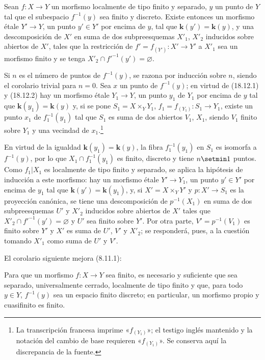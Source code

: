 \begin{corollary}[18.12.3]
\label{IV.18.12.3}
Sean $f:X\to Y$ un morfismo localmente de tipo finito y separado, $y$ un punto de $Y$ tal que el subespacio $f^{-1}(y)$ sea finito y discreto. Existe entonces un morfismo étale $Y'\to Y$, un punto $y'\in Y'$ por encima de $y$, tal que $\boldsymbol{k}(y')=\boldsymbol{k}(y)$, y una descomposición de $X'$ en suma de dos subpreesquemas $X'_1$, $X'_2$ inducidos sobre abiertos de $X'$, tales que la restricción de $f'=f_{(Y')}:X'\to Y'$ a $X'_1$ sea un morfismo finito y se tenga $X'_2\cap f'^{-1}(y')=\varnothing$.
\end{corollary}

Si $n$ es el número de puntos de $f^{-1}(y)$, se razona por inducción sobre $n$, siendo el corolario trivial para $n=0$. Sea $x$ un punto de $f^{-1}(y)$; en virtud de (18.12.1) y (18.12.2) hay un morfismo étale $Y_1\to Y$, un punto $y_1$ de $Y_1$ por encima de $y$ tal que $\boldsymbol{k}(y_1)=\boldsymbol{k}(y)$ y, si se pone $S_1=X\times_Y Y_1$, $f_1=f_{(Y_1)}:S_1\to Y_1$, existe un punto $x_1$ de $f_1^{-1}(y_1)$ 
tal que $S_1$ es suma de dos abiertos $V_1$, $X_1$, siendo $V_1$ finito sobre $Y_1$ y una vecindad de $x_1$.\footnote{La transcripción francesa imprime «$f_{(Y_1)}$»; el testigo inglés mantenido y la notación del cambio de base requieren «$f_{(Y_1)}$». Se conserva aquí la discrepancia de la fuente.}



En virtud de la igualdad $\boldsymbol{k}(y_1)=\boldsymbol{k}(y)$, la fibra $f_1^{-1}(y_1)$ en $S_1$ es isomorfa a $f^{-1}(y)$, por lo que $X_1\cap f_1^{-1}(y_1)$ es finito, discreto y tiene $n\setmin 1$ puntos. Como $f_1|X_1$ es localmente de tipo finito y separado, se aplica la hipótesis de inducción a este morfismo: hay un morfismo étale $Y'\to Y_1$, un punto $y'\in Y'$ por encima de $y_1$ tal que $\boldsymbol{k}(y')=\boldsymbol{k}(y_1)$, y, si $X'=X\times_Y Y'$ y $p:X'\to S_1$ es la proyección canónica, se tiene una descomposición de $p^{-1}(X_1)$ en suma de dos subpreesquemas $U'$ y $X'_2$ inducidos sobre abiertos de $X'$ tales que $X'_2\cap f'^{-1}(y')=\varnothing$ y $U'$ sea finito sobre $Y'$. Por otra parte, $V'=p^{-1}(V_1)$ es finito sobre $Y'$ y $X'$ es suma de $U'$, $V'$ y $X'_2$; se responderá, pues, a la cuestión tomando $X'_1$ como suma de $U'$ y $V'$.

El corolario siguiente mejora (8.11.1):

\begin{corollary}[18.12.4]
\label{IV.18.12.4}
Para que un morfismo $f:X\to Y$ sea finito, es necesario y suficiente que sea separado, universalmente cerrado, localmente de tipo finito y que, para todo $y\in Y$, $f^{-1}(y)$ sea un espacio finito discreto; en particular, un morfismo propio y cuasifinito es finito.
\end{corollary}

